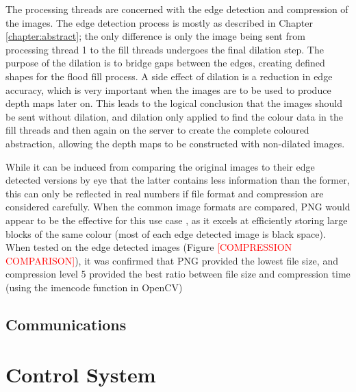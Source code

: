 The processing threads are concerned with the edge detection and compression of the images. The edge detection process is mostly as described in Chapter \ref{chapter:abstract}; the only difference is only the image being sent from processing thread 1 to the fill threads undergoes the final dilation step. The purpose of the dilation is to bridge gaps between the edges, creating defined shapes for the flood fill process. A side effect of dilation is a reduction in edge accuracy, which is very important when the images are to be used to produce depth maps later on. This leads to the logical conclusion that the images should be sent without dilation, and dilation only applied to find the colour data in the fill threads and then again on the server to create the complete coloured abstraction, allowing the depth maps to be constructed with non-dilated images. 

While it can be induced from comparing the original images to their edge detected versions by eye that the latter contains less information than the former, this can only be reflected in real numbers if file format and compression are considered carefully. When the common image formats are compared, PNG would appear to be the effective for this use case \cite{aguilera2006comparison}, as it excels at efficiently storing large blocks of the same colour (most of each edge detected image is black space). When tested on the edge detected images (Figure \textcolor{red}{[COMPRESSION COMPARISON]}), it was confirmed that PNG provided the lowest file size, and compression level 5 provided the best ratio between file size and compression time (using the imencode function in OpenCV)

\subsection{Communications}
\label{Subsection:comms}

\section{Control System}